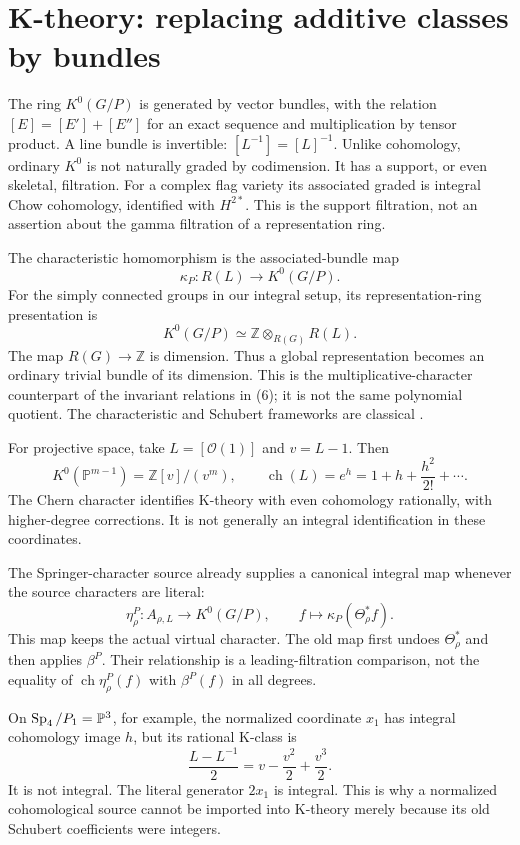 \documentclass[11pt,letterpaper]{article}
\newcommand{\Z}{\mathbb Z}\newcommand{\Q}{\mathbb Q}\newcommand{\C}{\mathbb C}
\newcommand{\ch}{\operatorname{ch}}\newcommand{\im}{\operatorname{im}}
\theoremstyle{definition}\newtheorem{definition}[theorem]{Definition}
\begin{document}
\section{K-theory: replacing additive classes by bundles}
The ring \(K^0(G/P)\) is generated by vector bundles, with the relation
\([E]=[E']+[E'']\) for an exact sequence and multiplication by tensor
product. A line bundle is invertible: \([L^{-1}]=[L]^{-1}\).
Unlike cohomology, ordinary \(K^0\) is not naturally graded by
codimension. It has a support, or even skeletal, filtration.
For a complex flag variety its associated graded is integral
Chow cohomology, identified with \(H^{2*}\).
This is the support filtration, not an assertion about the gamma
filtration of a representation ring.

The characteristic homomorphism is the associated-bundle map
\[
 \kappa_P:R(L)\longrightarrow K^0(G/P).
 \tag{29}
\]
For the simply connected groups in our integral setup, its
representation-ring presentation is
\[
 K^0(G/P)\simeq\Z\otimes_{R(G)}R(L).
 \tag{30}
\]
The map \(R(G)\to\Z\) is dimension. Thus a global representation
becomes an ordinary trivial bundle of its dimension. This is the
multiplicative-character counterpart of the invariant relations
in (6); it is not the same polynomial quotient.
The characteristic and Schubert frameworks are classical
\cite{GR,Karpenko}.

For projective space, take \(L=[\mathcal O(1)]\) and \(v=L-1\).
Then
\[
 K^0(\mathbb P^{m-1})=\Z[v]/(v^m),\qquad
 \ch(L)=e^h=1+h+\frac{h^2}{2!}+\cdots .
 \tag{31}
\]
The Chern character identifies K-theory with even cohomology
rationally, with higher-degree corrections. It is not generally
an integral identification in these coordinates.

The Springer-character source already supplies a canonical integral
map whenever the source characters are literal:
\[
 \eta_\rho^P:A_{\rho,L}\longrightarrow K^0(G/P),\qquad
 f\longmapsto\kappa_P(\Theta_\rho^*f).
 \tag{32}
\]
This map keeps the actual virtual character. The old map first
undoes \(\Theta_\rho^*\) and then applies \(\beta^P\).
Their relationship is a leading-filtration comparison, not the
equality of \(\ch\eta_\rho^P(f)\) with \(\beta^P(f)\) in all degrees.

On \(\operatorname{Sp}_4/P_1=\mathbb P^3\), for example, the normalized coordinate
\(x_1\) has integral cohomology image \(h\), but its rational
K-class is
\[
 \frac{L-L^{-1}}2=v-\frac{v^2}{2}+\frac{v^3}{2}.
 \tag{33}
\]
It is not integral. The literal generator \(2x_1\) is integral.
This is why a normalized cohomological source cannot be imported
into K-theory merely because its old Schubert coefficients were integers.
\end{document}

